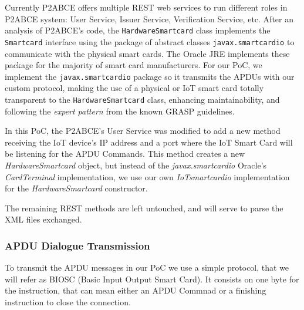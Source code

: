 Currently P2ABCE offers multiple REST web services to run different roles in P2ABCE system: User Service, Issuer Service, Verification Service, etc. 
%
After an analysis of P2ABCE's code, the \texttt{HardwareSmartcard} class implements the \texttt{Smartcard} interface using the package of abstract classes \texttt{javax.smartcardio} to communicate with the physical smart cards. The Oracle JRE implements these package for the majority of smart card manufacturers. For our PoC, we implement the \texttt{javax.smartcardio} package so it transmits the APDUs with our custom protocol, making the use of a physical or IoT smart card totally transparent to the \texttt{HardwareSmartcard} class, enhancing maintainability, and following the \textit{expert pattern} from the known GRASP guidelines.

In this PoC, the P2ABCE's User Service was modified to add a new method receiving the IoT device's  IP address and a port where the IoT Smart Card will be listening for the APDU Commands.
This method creates a new \textit{HardwareSmartcard} object, but instead of the \textit{javax.smartcardio} Oracle's \textit{CardTerminal} implementation, we use our own \textit{IoTsmartcardio} implementation for the \textit{HardwareSmartcard} constructor.


The remaining REST methods are left untouched, and will serve to parse the XML files exchanged.

\hfil

\subsubsection{APDU Dialogue Transmission}


To transmit the APDU messages in our PoC we use a simple protocol, that we will refer as BIOSC (Basic Input Output Smart Card). It consists on one byte for the instruction, that can mean either an APDU Commnad or a finishing instruction to close the connection.

